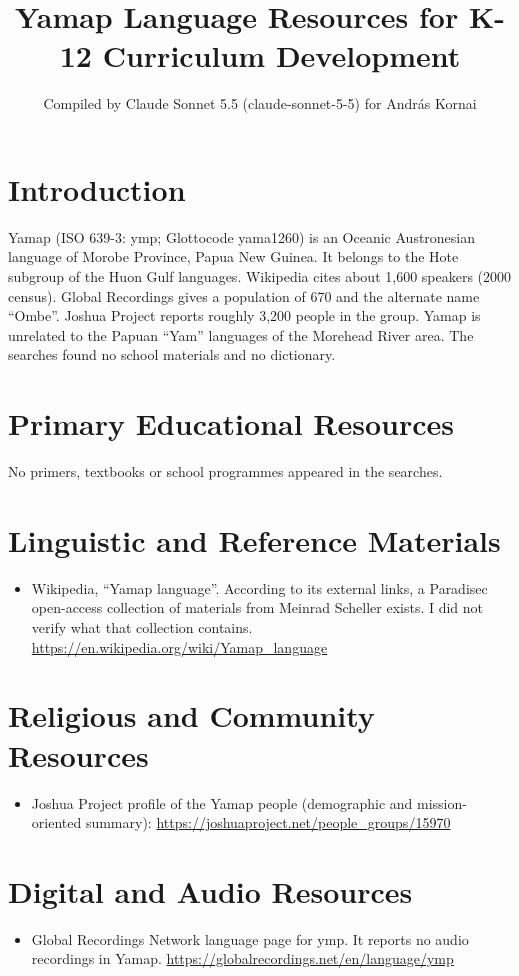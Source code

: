 \documentclass[12pt]{article}
\title{Yamap Language Resources for K-12 Curriculum Development}
\author{Compiled by Claude Sonnet 5.5 (claude-sonnet-5-5) for Andr\'as Kornai}
\date{}
\begin{document}
\maketitle

\section{Introduction}
Yamap (ISO 639-3: ymp; Glottocode yama1260) is an Oceanic Austronesian language of Morobe Province, Papua New Guinea. It belongs to the Hote subgroup of the Huon Gulf languages. Wikipedia cites about 1,600 speakers (2000 census). Global Recordings gives a population of 670 and the alternate name ``Ombe''. Joshua Project reports roughly 3,200 people in the group. Yamap is unrelated to the Papuan ``Yam'' languages of the Morehead River area. The searches found no school materials and no dictionary.

\section{Primary Educational Resources}
No primers, textbooks or school programmes appeared in the searches.

\section{Linguistic and Reference Materials}
\begin{itemize}
\item Wikipedia, ``Yamap language''. According to its external links, a Paradisec open-access collection of materials from Meinrad Scheller exists. I did not verify what that collection contains. \url{https://en.wikipedia.org/wiki/Yamap_language}
\end{itemize}

\section{Religious and Community Resources}
\begin{itemize}
\item Joshua Project profile of the Yamap people (demographic and mission-oriented summary): \url{https://joshuaproject.net/people_groups/15970}
\end{itemize}

\section{Digital and Audio Resources}
\begin{itemize}
\item Global Recordings Network language page for ymp. It reports no audio recordings in Yamap. \url{https://globalrecordings.net/en/language/ymp}
\end{itemize}
\end{document}
